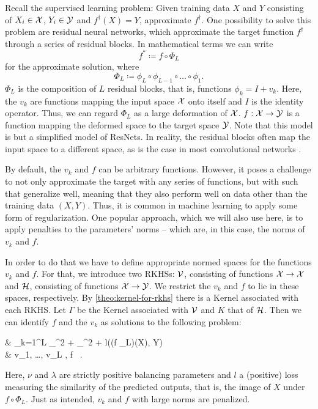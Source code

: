Recall the supervised learning problem: Given training data $X$ and $Y$ consisting of $X_i \in \mathcal{X}$, $Y_i \in \mathcal{Y}$ and $f^\dagger(X) = Y$, approximate $f^\dagger$.
One possibility to solve this problem are residual neural networks, which approximate the target function $f^\dagger$ through a series of residual blocks.
In mathematical terms we can write
\begin{equation}
	f^\ast \coloneqq f \circ \Phi_L 
\end{equation}
for the approximate solution, where
\begin{equation}
\Phi_L \coloneqq \phi_L \circ \phi_{L-1} \circ \ldots \circ \phi_1.
\end{equation} 
$\Phi_L$ is the composition of $L$ residual blocks, that is, functions $\phi_k = I + v_k$.
Here, the $v_k$ are functions mapping the input space $\mathcal{X}$ onto itself and $I$ is the identity operator.
Thus, we can regard $\Phi_L$ as a large deformation of $\mathcal{X}$.
$f: \mathcal{X} \to \mathcal{Y}$ is a function mapping the deformed space to the target space $\mathcal{Y}$.
Note that this model is but a simplified model of ResNets.
In reality, the residual blocks often map the input space to a different space, as is the case in most convolutional networks \cite{he16}.

By default, the $v_k$ and $f$ can be arbitrary functions.
However, it poses a challenge to not only approximate the target with any series of functions, but with such that generalize well, meaning that they also perform well on data other than the training data $(X, Y)$.
Thus, it is common in machine learning \cite{goodfellow16} to apply some form of regularization.
One popular approach, which we will also use here, is to apply penalties to the parameters' norms -- which are, in this case, the norms of $v_k$ and $f$.

In order to do that we have to define appropriate normed spaces for the functions $v_k$ and $f$.
For that, we introduce two RKHSs:
$\mathcal{V}$, consisting of functions $\mathcal{X} \rightarrow \mathcal{X}$ and $\mathcal{H}$, consisting of functions $\mathcal{X} \rightarrow \mathcal{Y}$.
We restrict the $v_k$ and $f$ to lie in these spaces, respectively.
By \cref{theo:kernel-for-rkhs} there is a Kernel associated with each RKHS.
Let $\Gamma$ be the Kernel associated with $\mathcal{V}$ and $K$ that of $\mathcal{H}$.
Then we can identify $f$ and the $v_k$ as solutions to the following problem:
\begin{problem}
	\label{prob:min-v-f}
	\begin{cases}
		 & \nu \cdot {} \sum_{k=1}^{L} _\cV^2
		+ \lambda {}_\cH^2 
		+ l((f \circ \Phi_L)(X), Y) \\
		 & v_1, \ldots, v_L \in \cV, f \in \cH \ .
	\end{cases}
\end{problem}
Here, $\nu$ and $\lambda$ are strictly positive balancing parameters and $l$ a (positive) loss measuring the similarity of the predicted outputs, that is, the image of $X$ under $f \circ \Phi_L$.
Just as intended, $v_k$ and $f$ with large norms are penalized.

